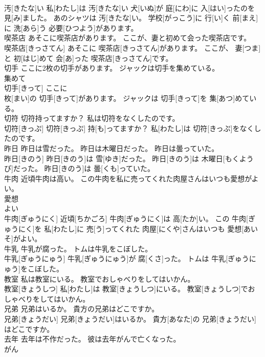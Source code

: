 \documentclass[8pt]{extreport}
\begin{document}
\begin{CJK}{UTF8}{min}
\\	汚[きたな]い 私[わたし]は 汚[きたな]い 犬[いぬ]が 庭[にわ]に 入[はい]ったのを 見[み]ました。 あのシャツは 汚[きたな]い。 学校[がっこう]に 行[い]く 前[まえ]に 洗[あら]う 必要[ひつよう]があります。
\\	喫茶店 あそこに喫茶店があります。 ここが、妻と初めて会った喫茶店です。	
\\	喫茶店[きっさてん] あそこに 喫茶店[きっさてん]があります。 ここが、 妻[つま]と 初[はじ]めて 会[あ]った 喫茶店[きっさてん]です。
\\	切手 ここに2枚の切手があります。 ジャックは切手を集めている。	
\\	集めて
\\	切手[きって] ここに 
\\	枚[まい]の 切手[きって]があります。 ジャックは 切手[きって]を 集[あつ]めている。
\\	切符 切符持ってますか？ 私は切符をなくしたのです。	
\\	切符[きっぷ] 切符[きっぷ] 持[も]ってますか？ 私[わたし]は 切符[きっぷ]をなくしたのです。
\\	昨日 昨日は雪だった。 昨日は木曜日だった。 昨日は曇っていた。	
\\	昨日[きのう] 昨日[きのう]は 雪[ゆき]だった。 昨日[きのう]は 木曜日[もくようび]だった。 昨日[きのう]は 曇[くも]っていた。
\\	牛肉 近頃牛肉は高い。 この牛肉を私に売ってくれた肉屋さんはいつも愛想がよい。	
\\	愛想 
\\	よい 
\\	牛肉[ぎゅうにく] 近頃[ちかごろ] 牛肉[ぎゅうにく]は 高[たか]い。 この 牛肉[ぎゅうにく]を 私[わたし]に 売[う]ってくれた 肉屋[にくや]さんはいつも 愛想[あいそ]がよい。
\\	牛乳 牛乳が腐った。 トムは牛乳をこぼした。	
\\	牛乳[ぎゅうにゅう] 牛乳[ぎゅうにゅう]が 腐[くさ]った。 トムは 牛乳[ぎゅうにゅう]をこぼした。
\\	教室 私は教室にいる。 教室でおしゃべりをしてはいかん。	
\\	教室[きょうしつ] 私[わたし]は 教室[きょうしつ]にいる。 教室[きょうしつ]でおしゃべりをしてはいかん。
\\	兄弟 兄弟はいるか。 貴方の兄弟はどこですか。	
\\	兄弟[きょうだい] 兄弟[きょうだい]はいるか。 貴方[あなた]の 兄弟[きょうだい]はどこですか。
\\	去年 去年は不作だった。 彼は去年がんで亡くなった。	
\\	がん

\end{CJK}
\end{document}
